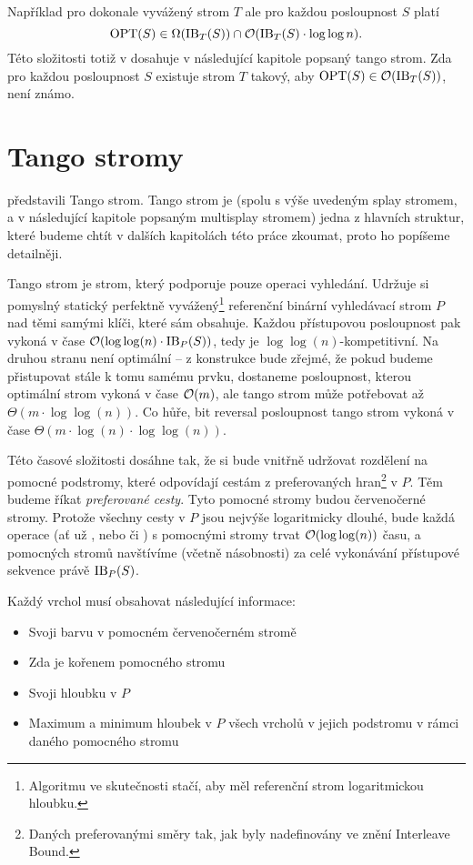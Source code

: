 Například pro dokonale vyvážený strom $T$ ale pro každou posloupnost $S$ platí $$\operatorname{OPT}(S) \in \Omega(\operatorname{IB}_T(S)) \cap \mathcal O(\operatorname{IB}_T(S)\cdot\log\log n).$$ Této složitosti totiž v dosahuje v následující kapitole popsaný tango strom.
Zda pro každou posloupnost $S$ existuje
strom $T$ takový, aby $\operatorname{OPT}(S)\in\mathcal O(\operatorname{IB}_T(S))$, není známo.  

\section{Tango stromy}\label{sec:tango}

\citet{tango} představili Tango strom. Tango strom je (spolu s výše uvedeným splay stromem, a v následující kapitole popsaným multisplay stromem) jedna z hlavních struktur, které budeme chtít v dalších kapitolách této práce zkoumat, proto ho popíšeme detailněji.

Tango strom je strom, který podporuje pouze operaci vyhledání. Udržuje si
pomyslný statický perfektně vyvážený\footnote{Algoritmu ve skutečnosti stačí,
aby měl referenční strom logaritmickou hloubku.} referenční binární vyhledávací
strom $P$ nad těmi samými klíči, které sám obsahuje. Každou přístupovou
posloupnost pak vykoná v čase $\mathcal O(\log\log(n)\cdot \operatorname{IB}_P(S))$, tedy je
$\log\log(n)$-kompetitivní. Na druhou stranu není optimální -- z konstrukce
bude zřejmé, že pokud budeme přistupovat stále k tomu samému prvku, dostaneme posloupnost, kterou optimální strom
 vykoná v čase $\mathcal O(m)$, ale tango strom může potřebovat až
$\Theta(m\cdot\log\log(n))$. Co hůře, bit reversal posloupnost tango strom vykoná v čase $\Theta(m\cdot\log(n)\cdot \log\log(n))$.

Této časové složitosti dosáhne tak, že si bude vnitřně udržovat rozdělení na
pomocné podstromy, které odpovídají cestám z preferovaných hran\footnote{Daných
preferovanými směry tak, jak byly nadefinovány ve znění Interleave Bound.} v
$P$. Těm budeme říkat \emph{preferované cesty}. Tyto pomocné stromy budou červenočerné stromy. Protože všechny cesty v $P$
jsou nejvýše logaritmicky dlouhé, bude každá operace (ať už , nebo 
či ) s pomocnými stromy trvat $\mathcal O(\log\log(n))$ času, a pomocných stromů
navštívíme (včetně násobnosti) za celé vykonávání přístupové sekvence právě
$\operatorname{IB}_P(S)$.

Každý vrchol musí obsahovat následující informace:
\begin{itemize}
\item Svoji barvu v pomocném červenočerném stromě
\item Zda je kořenem pomocného stromu
\item Svoji hloubku v $P$
\item Maximum a minimum hloubek v $P$ všech vrcholů v jejich podstromu v rámci daného pomocného stromu
\end{itemize}

